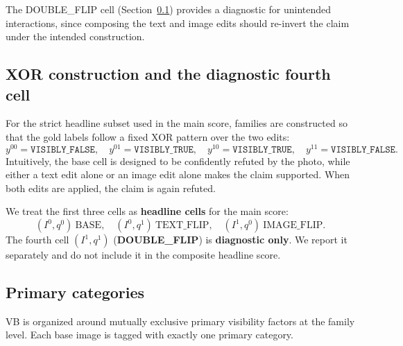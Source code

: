 \documentclass[11pt]{article}
\newcommand{\benchmarkname}{\textsc{VB}}
\begin{document}
The DOUBLE\_FLIP cell (Section~\ref{subsec:xor}) provides a diagnostic for unintended interactions, since composing the text and image edits should re-invert the claim under the intended construction.

\subsection{XOR construction and the diagnostic fourth cell}
\label{subsec:xor}

For the strict headline subset used in the main score, families are constructed so that the gold labels follow a fixed XOR pattern over the two edits:
\[
y^{00}=\texttt{VISIBLY\_FALSE},\quad
y^{01}=\texttt{VISIBLY\_TRUE},\quad
y^{10}=\texttt{VISIBLY\_TRUE},\quad
y^{11}=\texttt{VISIBLY\_FALSE}.
\]
Intuitively, the base cell is designed to be confidently refuted by the photo, while either a text edit alone or an image edit alone makes the claim supported. When both edits are applied, the claim is again refuted.

We treat the first three cells as \textbf{headline cells} for the main score:
\[
(I^0,q^0)\ \text{BASE},\quad (I^0,q^1)\ \text{TEXT\_FLIP},\quad (I^1,q^0)\ \text{IMAGE\_FLIP}.
\]
The fourth cell \((I^1,q^1)\) (\textbf{DOUBLE\_FLIP}) is \textbf{diagnostic only}. We report it separately and do not include it in the composite headline score.

\subsection{Primary categories}

\benchmarkname{} is organized around mutually exclusive primary visibility factors at the family level. Each base image is tagged with exactly one primary category.
\end{document}
